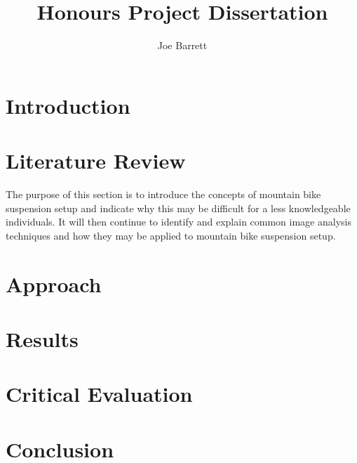 \documentclass[a4paper, 12pt, hidelinks]{article}
\title{Honours Project Dissertation}
\author{Joe Barrett}
\begin{document}
	\setcounter{secnumdepth}{4}
	\setcounter{tocdepth}{3}
	
	
	\setcounter{page}{1}
	\begin{abstract}\noindent
		\blindtext
	\end{abstract}
	\newpage
	\tableofcontents
	\newpage
	\listoftables
	\newpage
	\listoffigures
	\newpage
	\section{Introduction}
	
	\section{Literature Review}
	The purpose of this section is to introduce the concepts of mountain bike suspension setup and indicate why this may be difficult for a less knowledgeable individuals. It will then continue to identify and explain common image analysis techniques and how they may be applied to mountain bike suspension setup.
	
	
	
	
	\newpage
	\section{Approach}
	\newpage	
	\section{Results}
	\newpage
	\section{Critical Evaluation}
	\newpage
	\section{Conclusion}
	\newpage
		
	\newpage
	\printacronyms
	\printglossary[type=main]
\end{document}
